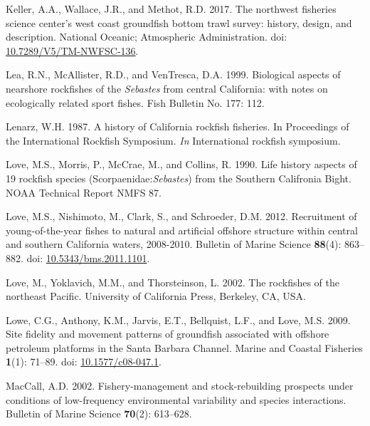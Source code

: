 \documentclass[
  english,
  a4paper,
]{article}
\newlength{\cslhangindent}
\newlength{\cslentryspacingunit} %
\newenvironment{CSLReferences}[2] %
 {%
  \setlength{\parindent}{0pt}
  \ifodd #1
  \let\oldpar\par
  \def\par{\hangindent=\cslhangindent\oldpar}
  \fi
  \setlength{\parskip}{#2\cslentryspacingunit}
 }%
 {}
\begin{document}
\begin{CSLReferences}{1}{0}
\leavevmode{}%
Keller, A.A., Wallace, J.R., and Methot, R.D. 2017. {The northwest fisheries science center's west coast groundfish bottom trawl survey: history, design, and description}. National Oceanic; Atmospheric Administration. doi: \href{https://doi.org/10.7289/V5/TM-NWFSC-136}{10.7289/V5/TM-NWFSC-136}.

\leavevmode{}%
Lea, R.N., McAllister, R.D., and VenTresca, D.A. 1999. {Biological aspects of nearshore rockfishes of the \emph{Sebastes} from central California: with notes on ecologically related sport fishes.} Fish Bulletin No. 177: 112.

\leavevmode{}%
Lenarz, W.H. 1987. {A history of California rockfish fisheries. In Proceedings of the International Rockfish Symposium.} \emph{In} International rockfish symposium.

\leavevmode{}%
Love, M.S., Morris, P., McCrae, M., and Collins, R. 1990. {Life history aspects of 19 rockfish species (Scorpaenidae:\emph{Sebastes}) from the Southern Califronia Bight}. NOAA Technical Report NMFS 87.

\leavevmode{}%
Love, M.S., Nishimoto, M., Clark, S., and Schroeder, D.M. 2012. {Recruitment of young-of-the-year fishes to natural and artificial offshore structure within central and southern California waters, 2008-2010}. Bulletin of Marine Science \textbf{88}(4): 863--882. doi: \href{https://doi.org/10.5343/bms.2011.1101}{10.5343/bms.2011.1101}.

\leavevmode{}%
Love, M., Yoklavich, M.M., and Thorsteinson, L. 2002. {The rockfishes of the northeast Pacific}. University of California Press, Berkeley, CA, USA.

\leavevmode{}%
Lowe, C.G., Anthony, K.M., Jarvis, E.T., Bellquist, L.F., and Love, M.S. 2009. {Site fidelity and movement patterns of groundfish associated with offshore petroleum platforms in the Santa Barbara Channel}. Marine and Coastal Fisheries \textbf{1}(1): 71--89. doi: \href{https://doi.org/10.1577/c08-047.1}{10.1577/c08-047.1}.

\leavevmode{}%
MacCall, A.D. 2002. {Fishery-management and stock-rebuilding prospects under conditions of low-frequency environmental variability and species interactions}. Bulletin of Marine Science \textbf{70}(2): 613--628.


\end{CSLReferences}
\end{document}
